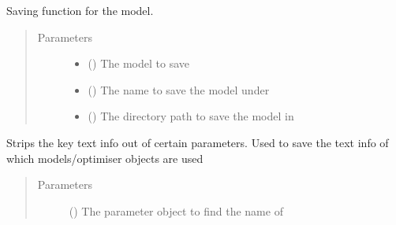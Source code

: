 \documentclass[letterpaper,10pt,english]{sphinxmanual}
\begin{document}
\begin{fulllineitems}
\label{\detokenize{deeplearning:Foresight.deeplearning.model_save}}
Saving function for the model.
\begin{quote}\begin{description}
\item[{Parameters}] \leavevmode\begin{itemize}
\item {} 
 () \textendash{} The model to save

\item {} 
 () \textendash{} The name to save the model under

\item {} 
 () \textendash{} The directory path to save the model in

\end{itemize}

\end{description}\end{quote}

\end{fulllineitems}


\begin{fulllineitems}
\label{\detokenize{deeplearning:Foresight.deeplearning.param_strip}}
Strips the key text info out of certain parameters.
Used to save the text info of which models/optimiser objects are used
\begin{quote}\begin{description}
\item[{Parameters}] \leavevmode
{} () \textendash{} The parameter object to find the name of

\end{description}\end{quote}

\end{fulllineitems}
\end{document}
